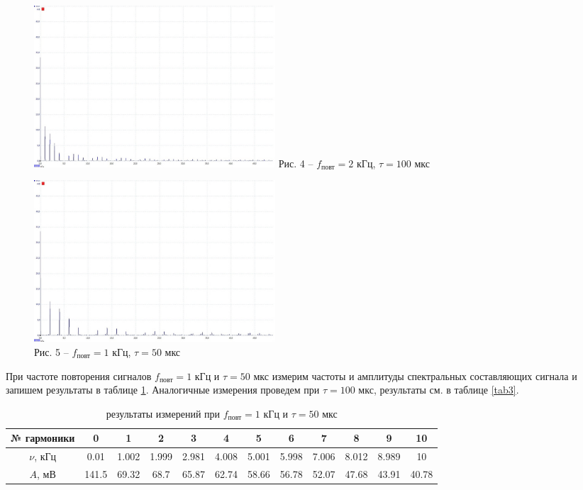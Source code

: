 \documentclass[a4paper,14pt]{article}
\begin{document}
\begin{figure}[!h]
\parbox[!h]{0.5\textwidth}{\null
	\centering
	\includegraphics[width = 9cm]{4.jpeg}
	Рис. 4 -- $f_{\text{повт}} = 2$ кГц, $\tau = 100$ мкс}
\parbox[!h]{0.5\textwidth}{\null
	\centering
	\includegraphics[width = 9cm]{5.jpeg} \\
	Рис. 5 -- $f_{\text{повт}} = 1$ кГц, $\tau = 50$ мкс}
\end{figure}

При частоте повторения сигналов $f_\text{повт} = 1$ кГц  и $\tau = 50$ мкс измерим частоты и амплитуды спектральных составляющих сигнала и запишем результаты в таблице \ref{tab2}. Аналогичные измерения проведем при $\tau = 100$ мкс, результаты см. в таблице \ref{tab3}. 


\begin{table}[hbt!]
\begin{center}
\begin{tabular}{|c|c|c|c|c|c|c|c|c|c|c|c|}
	\hline
	№ гармоники & 0     & 1     & 2     & 3     & 4     & 5     & 6     & 7     & 8     & 9     & 10    \\ \hline
	$\nu$, кГц      & 0.01  & 1.002 & 1.999 & 2.981 & 4.008 & 5.001 & 5.998 & 7.006 & 8.012 & 8.989 & 10    \\ \hline
	$A$, мВ         & 141.5 & 69.32 & 68.7  & 65.87 & 62.74 & 58.66 & 56.78 & 52.07 & 47.68 & 43.91 & 40.78 \\ \hline
\end{tabular}
\caption{результаты измерений при $f_\text{повт} = 1$ кГц  и $\tau = 50$ мкс}
\label{tab2}
\end{center}
\end{table}
\end{document}
